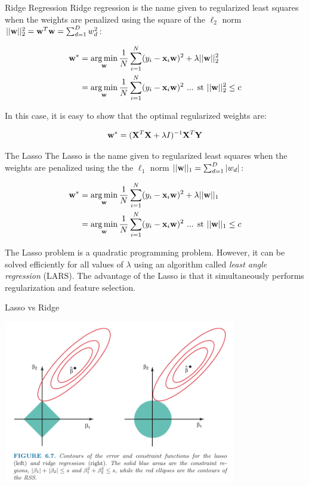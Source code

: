 \documentclass[serif,xcolor=pdftex,dvipsnames,table,hyperref={bookmarks=false,breaklinks}]{beamer}
\begin{document}
\begin{frame}[t]{Ridge Regression} 
Ridge regression is the name given to regularized least squares when the weights are penalized using the square
of the $\ell_2$ norm $||{\mathbf{w}}||_2^2 = {\mathbf{w}}^T{\mathbf{w}} = \sum_{d=1}^D w_d^2 $:

\pause
\begin{align*}
{\mathbf{w}}^* &= \operatorname*{arg\,min}_{{\mathbf{w}}} \frac{1}{N}\sum_{i=1}^N(y_i - {\mathbf{x}}_i{\mathbf{w}})^2 + \lambda ||{\mathbf{w}}||_2^2\\
          &= \operatorname*{arg\,min}_{{\mathbf{w}}} \frac{1}{N}\sum_{i=1}^N(y_i - {\mathbf{x}}_i{\mathbf{w}})^2 
          \mbox{ ... st } ||{\mathbf{w}}||_2^2 \leq c
\end{align*}

\pause
In this case, it is easy to show that the optimal regularized weights are:

$${\mathbf{w}}^*  = ({\mathbf{X}}^T{\mathbf{X}}+\lambda I)^{-1}{\mathbf{X}}^T{\mathbf{Y}}$$

\end{frame}

\begin{frame}[t]{The Lasso} 
The Lasso is the name given to regularized least squares when the weights are penalized using the the $\ell_1$ norm $||{\mathbf{w}}||_1 = \sum_{d=1}^D |w_d|$:

\pause
\begin{align*}
{\mathbf{w}}^* &= \operatorname*{arg\,min}_{{\mathbf{w}}} \frac{1}{N}\sum_{i=1}^N(y_i - {\mathbf{x}}_i{\mathbf{w}})^2 + \lambda ||{\mathbf{w}}||_1\\
          &= \operatorname*{arg\,min}_{{\mathbf{w}}} \frac{1}{N}\sum_{i=1}^N(y_i - {\mathbf{x}}_i{\mathbf{w}})^2 
          \mbox{ ... st } ||{\mathbf{w}}||_1 \leq c
\end{align*}

\pause
The Lasso problem is a quadratic programming problem. However, it can be solved efficiently for all values of
$\lambda$ using an algorithm called \textit{least angle regression} (LARS). The advantage of the Lasso is that
it simultaneously performs regularization and feature selection.
\end{frame}

\begin{frame}[t]{Lasso vs Ridge} 

\center
\includegraphics[width=4in]{../Figures/ridge_vs_lasso.png}

\end{frame}
\end{document}
